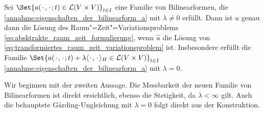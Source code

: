 \documentclass[../main.tex]{subfiles}
\begin{document}
\begin{Proposition}
\label{lemma:transformation_zu_elliptischem_operator}
    Sei $\Set{a(\blank, \blank; t) \in \mathcal L(V \times V)}_{t \in I}$ eine Familie von Bilinearformen, die \cref{annahme:eigenschaften_der_bilinearform_a} mit $\lambda \neq 0$ erfüllt.
    Dann ist $u$ genau dann die Lösung des Raum"=Zeit"=Variationsproblems \cref{eq:absktrakte_raum_zeit_formulierung}, wenn $\hat{u}$ die Lösung von  \cref{eq:transformiertes_raum_zeit_variationsproblem} ist.
    Insbesondere erfüllt die Familie $\Set{a(\blank, \blank; t) + \lambda \skp{\blank}{\blank}{H} \in \mathcal L(V \times V)}_{t \in I}$ \cref{annahme:eigenschaften_der_bilinearform_a} mit $\lambda = 0$.

    \begin{Beweis}
        Wir beginnen mit der zweiten Aussage.
        Die Messbarkeit der neuen Familie von Bilinearformen ist direkt ersichtlich, ebenso die Stetigkeit, da $\lambda < \infty$ gilt.
        Auch die behauptete G\aa{}rding-Ungleichung mit $\lambda = 0$ folgt direkt aus der Konstruktion.


\end{Beweis}
\end{Proposition}
\end{document}
